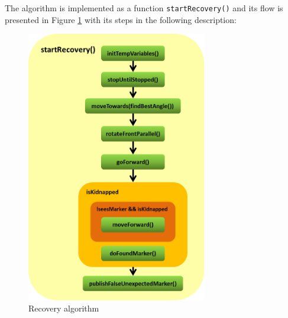 %


The algorithm is implemented as a function \texttt{startRecovery()} and its flow is presented in Figure \ref{start_recovery} with its steps in the following description:

\begin{figure}[htb]
\centering
\includegraphics[width=0.7\textwidth]{graphics/start_recovery.png}
\caption{Recovery algorithm}
\label{start_recovery}
\centering
\end{figure}

